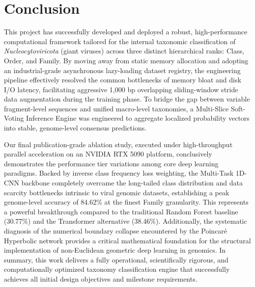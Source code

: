 \documentclass[11pt,a4paper]{article}
\begin{document}
\section{Conclusion}
This project has successfully developed and deployed a robust, high-performance computational framework tailored for the internal taxonomic classification of \textit{Nucleocytoviricota} (giant viruses) across three distinct hierarchical ranks: Class, Order, and Family. By moving away from static memory allocation and adopting an industrial-grade asynchronous lazy-loading dataset registry, the engineering pipeline effectively resolved the common bottlenecks of memory bloat and disk I/O latency, facilitating aggressive 1,000 bp overlapping sliding-window stride data augmentation during the training phase. To bridge the gap between variable fragment-level sequences and unified macro-level taxonomies, a Multi-Slice Soft-Voting Inference Engine was engineered to aggregate localized probability vectors into stable, genome-level consensus predictions.

Our final publication-grade ablation study, executed under high-throughput parallel acceleration on an NVIDIA RTX 5090 platform, conclusively demonstrates the performance tier variations among core deep learning paradigms. Backed by inverse class frequency loss weighting, the Multi-Task 1D-CNN backbone completely overcame the long-tailed class distribution and data scarcity bottlenecks intrinsic to viral genomic datasets, establishing a peak genome-level accuracy of 84.62\% at the finest Family granularity. This represents a powerful breakthrough compared to the traditional Random Forest baseline (30.77\%) and the Transformer alternative (38.46\%). Additionally, the systematic diagnosis of the numerical boundary collapse encountered by the Poincaré Hyperbolic network provides a critical mathematical foundation for the structural implementation of non-Euclidean geometric deep learning in genomics. In summary, this work delivers a fully operational, scientifically rigorous, and computationally optimized taxonomy classification engine that successfully achieves all initial design objectives and milestone requirements.
\end{document}
